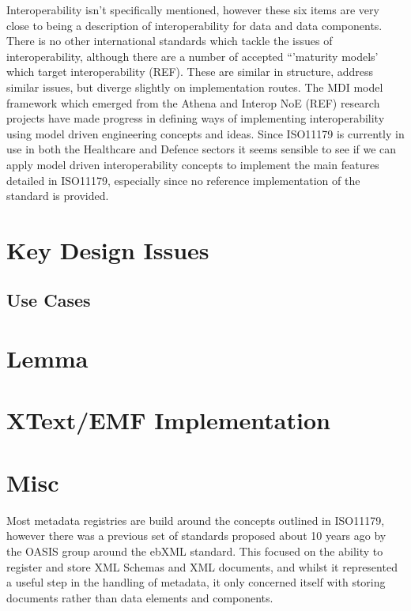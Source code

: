 \documentclass{article}
\begin{document}
Interoperability isn't specifically mentioned, however these six items are very close to being a description of interoperability for data and data components. There is no other international standards which tackle the issues of interoperability, although there are a number of accepted ``'maturity models' which target interoperability (REF). These are similar in structure, address similar issues, but diverge slightly on implementation routes. The MDI model framework which emerged from the Athena and Interop NoE (REF) research projects have made progress in defining ways of implementing interoperability using model driven engineering concepts and ideas. Since ISO11179 is currently in use in both the Healthcare and Defence sectors it seems sensible to see if we can apply model driven interoperability concepts to implement the main features detailed in ISO11179, especially since no reference implementation of the standard is provided.

\section{Key Design Issues}
\subsection{Use Cases}

\section{Lemma}

\section{XText/EMF Implementation}


 
 
 
\section{Misc}

Most metadata registries are build around the concepts outlined in ISO11179, however there was a previous set of standards proposed about 10 years ago by the OASIS \cite{ebXML} group around the ebXML standard. This focused on the ability to register and store XML Schemas and XML documents, and whilst it represented a useful step in the handling of metadata, it only concerned itself with storing documents rather than data elements and components. 
\end{document}
